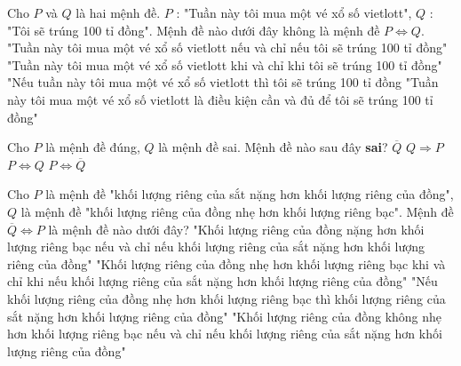 \begin{ex}%
	Cho $P$ và $Q$ là hai mệnh đề. $P$ : "Tuần này tôi mua một vé xổ số vietlott", $Q$ : 
	"Tôi sẽ trúng 100 tỉ đồng". Mệnh đề nào dưới đây không là mệnh đề $P \Leftrightarrow Q$. 
	\choice 
	{"Tuần này tôi mua một vé xổ số vietlott nếu và chỉ nếu tôi sẽ trúng 100 tỉ đồng" }
	{"Tuần này tôi mua một vé xổ số vietlott khi và chỉ khi tôi sẽ trúng 100 tỉ đồng"}
	{\True "Nếu tuần này tôi mua một vé xổ số vietlott thì tôi sẽ trúng 100 tỉ đồng}
	{"Tuần này tôi mua một vé xổ số vietlott là điều kiện cần và đủ để tôi sẽ trúng 100 tỉ đồng"}
\end{ex}

\begin{ex}%
	Cho $P$ là mệnh đề đúng, $Q$ là mệnh đề sai. Mệnh đề nào sau đây {\bf sai}?
	\choice 
	{$\overline{Q}$}
	{$Q \Rightarrow P$}
	{\True $P \Leftrightarrow Q$}
	{$P \Leftrightarrow \overline{Q}$}
\end{ex}

\begin{ex}%
	Cho $P$ là mệnh đề "khối lượng riêng của sắt nặng hơn khối lượng riêng của đồng", $Q$ là mệnh đề "khối lượng riêng của đồng nhẹ hơn khối lượng riêng bạc". Mệnh đề $\overline{Q} \Leftrightarrow P$ là mệnh đề nào dưới đây?
	\choice 
	{"Khối lượng riêng của đồng nặng hơn khối lượng riêng bạc nếu và chỉ nếu khối lượng riêng của sắt nặng hơn khối lượng riêng của đồng" }
	{"Khối lượng riêng của đồng nhẹ hơn khối lượng riêng bạc khi và chỉ khi nếu khối lượng riêng của sắt nặng hơn khối lượng riêng của đồng"}
	{"Nếu khối  lượng riêng của đồng nhẹ hơn khối lượng riêng bạc thì khối lượng riêng của sắt nặng hơn khối lượng riêng của đồng"}
	{\True "Khối lượng riêng của đồng không nhẹ hơn khối lượng riêng bạc nếu và chỉ nếu khối lượng riêng của sắt nặng hơn khối lượng riêng của đồng"}
\end{ex}

